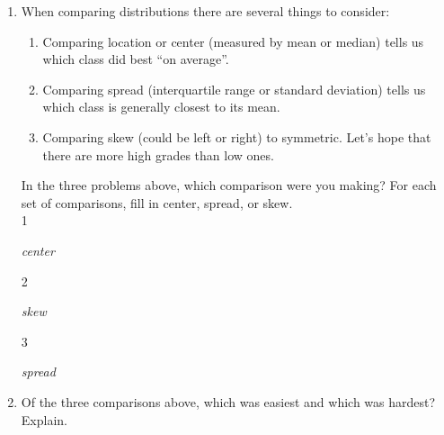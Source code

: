 \begin{enumerate}
  \item  When comparing distributions there are several things to consider:
    \begin{enumerate}
    \item  Comparing location or center (measured by mean or median)
      tells us which class did best ``on average''. 
    \item  Comparing spread (interquartile range or standard
      deviation) tells us which class is generally closest to its mean.
    \item  Comparing skew (could be left or right) to symmetric.
      Let's hope that there are more high grades than low ones. 
    \end{enumerate}
    In the three problems above, which comparison were you making?
    For each set of comparisons, fill in center, spread, or skew. \\
    1 
\begin{students}
\underline{\hspace*{3cm}}\hfill 
\end{students}
\begin{key}
  \underline{\hspace*{1cm}}  {\it  center} \underline{\hspace*{1cm}}\hfill 
\end{key} 
    2 
\begin{students}
   \underline{\hspace*{3cm}}\hfill 
\end{students}
\begin{key}
  \underline{\hspace*{1cm}}  {\it  skew} \underline{\hspace*{1cm}}\hfill 
\end{key}
    3 
\begin{students}
  \underline{\hspace*{3cm}}\hfill 
\end{students}
\begin{key}
  \underline{\hspace*{1cm}}  {\it spread} \underline{\hspace*{1cm}}\hfill 
\end{key}
  \item   Of the three comparisons above, which was easiest and which
    was hardest? Explain. 
\begin{students}
    \vspace{2cm}    
\end{students}


\end{enumerate}
